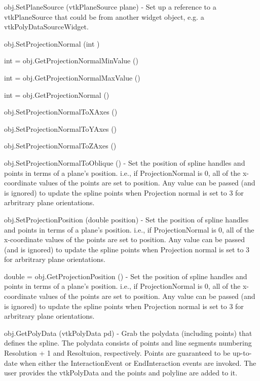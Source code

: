 \begin{DoxyItemize}
\item {\ttfamily obj.\-Set\-Plane\-Source (vtk\-Plane\-Source plane)} -\/ Set up a reference to a vtk\-Plane\-Source that could be from another widget object, e.\-g. a vtk\-Poly\-Data\-Source\-Widget.  
\item {\ttfamily obj.\-Set\-Projection\-Normal (int )}  
\item {\ttfamily int = obj.\-Get\-Projection\-Normal\-Min\-Value ()}  
\item {\ttfamily int = obj.\-Get\-Projection\-Normal\-Max\-Value ()}  
\item {\ttfamily int = obj.\-Get\-Projection\-Normal ()}  
\item {\ttfamily obj.\-Set\-Projection\-Normal\-To\-X\-Axes ()}  
\item {\ttfamily obj.\-Set\-Projection\-Normal\-To\-Y\-Axes ()}  
\item {\ttfamily obj.\-Set\-Projection\-Normal\-To\-Z\-Axes ()}  
\item {\ttfamily obj.\-Set\-Projection\-Normal\-To\-Oblique ()} -\/ Set the position of spline handles and points in terms of a plane's position. i.\-e., if Projection\-Normal is 0, all of the x-\/coordinate values of the points are set to position. Any value can be passed (and is ignored) to update the spline points when Projection normal is set to 3 for arbritrary plane orientations.  
\item {\ttfamily obj.\-Set\-Projection\-Position (double position)} -\/ Set the position of spline handles and points in terms of a plane's position. i.\-e., if Projection\-Normal is 0, all of the x-\/coordinate values of the points are set to position. Any value can be passed (and is ignored) to update the spline points when Projection normal is set to 3 for arbritrary plane orientations.  
\item {\ttfamily double = obj.\-Get\-Projection\-Position ()} -\/ Set the position of spline handles and points in terms of a plane's position. i.\-e., if Projection\-Normal is 0, all of the x-\/coordinate values of the points are set to position. Any value can be passed (and is ignored) to update the spline points when Projection normal is set to 3 for arbritrary plane orientations.  
\item {\ttfamily obj.\-Get\-Poly\-Data (vtk\-Poly\-Data pd)} -\/ Grab the polydata (including points) that defines the spline. The polydata consists of points and line segments numbering Resolution + 1 and Resoltuion, respectively. Points are guaranteed to be up-\/to-\/date when either the Interaction\-Event or End\-Interaction events are invoked. The user provides the vtk\-Poly\-Data and the points and polyline are added to it.  

\end{DoxyItemize}
